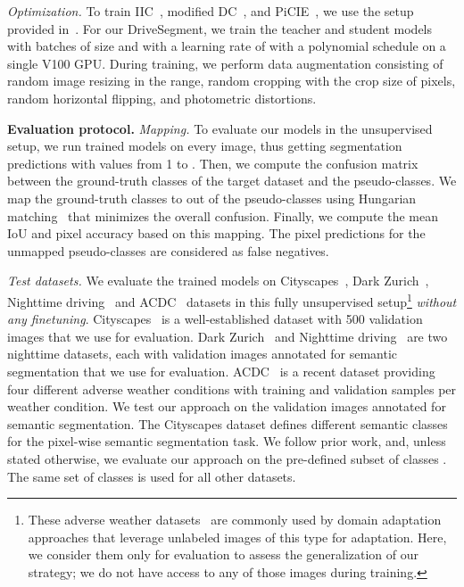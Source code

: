 \documentclass[runningheads]{llncs}
\newcommand{\ours}{DriveSegment\xspace}
\newcommand{\paragraphcustom}[1]{\smallskip\noindent\textbf{#1}}
\begin{document}
\emph{Optimization.} To train IIC~\cite{ji2019invariant}, modified DC~\cite{caron2018deep}, and PiCIE~\cite{cho2021picie}, we use the setup provided in~\cite{cho2021picie}.
For our \ours, we train the teacher and student models 
with batches of size  and with a learning rate of  with a polynomial schedule on a single 
V100 GPU. 
During training, we perform data augmentation consisting of random image resizing in the  range, random cropping with the crop size of  pixels, random horizontal flipping, and photometric distortions.


\paragraphcustom{Evaluation protocol.}
\label{sec:evaluation_protocol}
\emph{Mapping.} To evaluate our models in the unsupervised setup, we run trained models on every image, thus getting segmentation predictions with values from 1 to .  Then, we compute the confusion matrix between the  ground-truth classes of the target dataset and the  pseudo-classes. We map the  ground-truth classes to  out of the  pseudo-classes using Hungarian matching~\cite{Kuhn1955thehungarian} that minimizes the overall confusion. Finally, we compute the 
mean IoU and pixel accuracy based on this mapping. The pixel predictions for the  unmapped pseudo-classes are considered as false negatives.

\emph{Test datasets.}
We evaluate the trained models on Cityscapes~\cite{Cordts2016Cityscapes},  Dark Zurich~\cite{SDV20}, Nighttime driving~\cite{daytime:2:nighttime} and ACDC~\cite{SDV21} datasets in this fully unsupervised setup\footnote{ These adverse weather datasets~\cite{daytime:2:nighttime,SDV20,SDV21} are commonly used by domain adaptation approaches that leverage unlabeled images of this type for adaptation. Here, we consider them only for evaluation to assess the generalization of our strategy; we do not have access to any of those images during training.} \emph{without any finetuning}. Cityscapes~\cite{Cordts2016Cityscapes} is a well-established dataset 
with 500 validation images that we use for evaluation. Dark Zurich~\cite{SDV20} and Nighttime driving~\cite{daytime:2:nighttime} are two nighttime datasets, each with  validation images annotated for semantic segmentation that we use for evaluation. ACDC~\cite{SDV21} is a recent dataset providing four different adverse weather conditions with  training and  validation samples per weather condition. We test our approach on the validation images annotated for semantic segmentation. The Cityscapes dataset defines  different semantic classes for the pixel-wise semantic segmentation task. We follow prior work, and, unless stated otherwise, we evaluate our approach on the pre-defined subset of  classes \cite{Cordts2016Cityscapes}. The same set of  classes is used for all other datasets.
\end{document}
